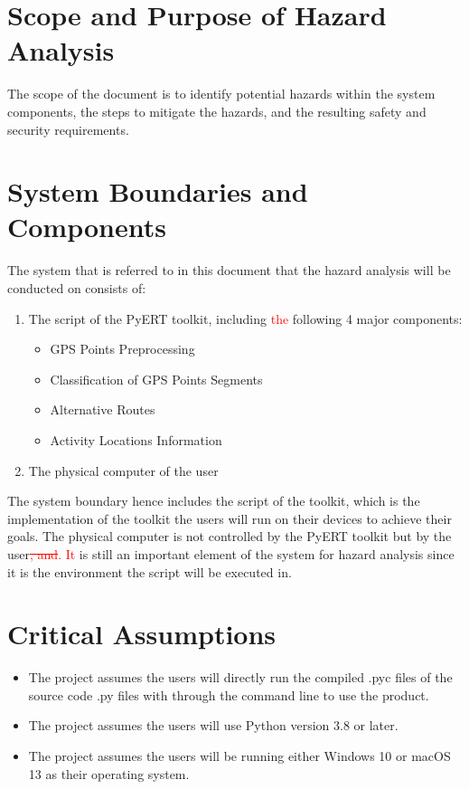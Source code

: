 \documentclass{article}
\begin{document}
\section{Scope and Purpose of Hazard Analysis}
The scope of the document is to identify potential hazards within the system components, the steps to mitigate the hazards, and the resulting safety and security requirements. 

\section{System Boundaries and Components}
The system that is referred to in this document that the hazard analysis will be conducted on consists of:
\begin{enumerate}
    \item The script of the PyERT toolkit, including \textcolor{red}{the} following 4 major components:
        \begin{itemize}
            \item GPS Points Preprocessing
            \item Classification of GPS Points Segments
            \item Alternative Routes 
            \item Activity Locations Information
        \end{itemize}
    \item The physical computer of the user
\end{enumerate}
The system boundary hence includes the script of the toolkit, which is the implementation of the toolkit the users will run on their devices to achieve their goals. The physical computer is not controlled by the PyERT toolkit but by the user\textcolor{red}{\sout{, and}. It} is still an important element of the system for hazard analysis since it is the environment the script will be executed in.

\section{Critical Assumptions}
\begin{itemize}
    \item The project assumes the users will directly run the compiled .pyc files of the source code .py files with through the command line to use the product.
    \item The project assumes the users will use Python version 3.8 or later.
    \item The project assumes the users will be running either Windows 10 or macOS 13 as their operating system.
\end{itemize}
\end{document}
